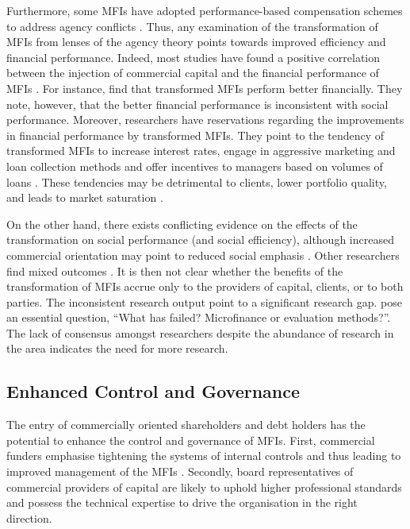 \documentclass[a4paper, nobind]{templates/ociamthesis}
\begin{document}
Furthermore, some MFIs have adopted performance-based compensation schemes to address agency conflicts \autocite{bateman2010doesn}. Thus, any examination of the transformation of MFIs from lenses of the agency theory points towards improved efficiency and financial performance. Indeed, most studies have found a positive correlation between the injection of commercial capital and the financial performance of MFIs \autocite{ouis2013profit}. For instance, \textcite{daher2013microfinance} find that transformed MFIs perform better financially. They note, however, that the better financial performance is inconsistent with social performance.
Moreover, researchers have reservations regarding the improvements in financial performance by transformed MFIs. They point to the tendency of transformed MFIs to increase interest rates, engage in aggressive marketing and loan collection methods and offer incentives to managers based on volumes of loans \autocite{ghosh2013microfinance}. These tendencies may be detrimental to clients, lower portfolio quality, and leads to market saturation \autocite{hoque2011commercialization}.

On the other hand, there exists conflicting evidence on the effects of the transformation on social performance (and social efficiency), although increased commercial orientation may point to reduced social emphasis \autocite{cobb2016funding,daher2013microfinance}. Other researchers find mixed outcomes \autocite{abdulai2017trade}. It is then not clear whether the benefits of the transformation of MFIs accrue only to the providers of capital, clients, or to both parties. The inconsistent research output point to a significant research gap.\autocite{awaworyi2016has} pose an essential question, ``What has failed? Microfinance or evaluation methods?''. The lack of consensus amongst researchers despite the abundance of research in the area indicates the need for more research.

\hypertarget{enhanced-control-and-governance}{%
\subsection{Enhanced Control and Governance}\label{enhanced-control-and-governance}}

\noindent The entry of commercially oriented shareholders and debt holders has the potential to enhance the control and governance of MFIs. First, commercial funders emphasise tightening the systems of internal controls and thus leading to improved management of the MFIs \autocite{mersland2009cost,mersland2010microfinance}. Secondly, board representatives of commercial providers of capital are likely to uphold higher professional standards and possess the technical expertise to drive the organisation in the right direction.
\end{document}
